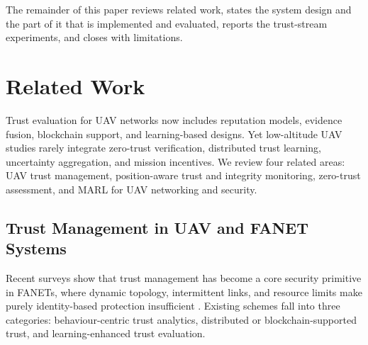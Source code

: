 \documentclass[notspecified,article,submit,moreauthors]{Definitions/mdpi}
\begin{document}
\begin{itemize}
\end{itemize}

The remainder of this paper reviews related work, states the system design and the part of it that is implemented and evaluated, reports the trust-stream experiments, and closes with limitations.

\section{Related Work}
Trust evaluation for UAV networks now includes reputation models, evidence fusion, blockchain support, and learning-based designs. Yet low-altitude UAV studies rarely integrate zero-trust verification, distributed trust learning, uncertainty aggregation, and mission incentives. We review four related areas: UAV trust management, position-aware trust and integrity monitoring, zero-trust assessment, and MARL for UAV networking and security.

\subsection{Trust Management in UAV and FANET Systems}
Recent surveys show that trust management has become a core security primitive in FANETs, where dynamic topology, intermittent links, and resource limits make purely identity-based protection insufficient \cite{kundu2024survey,noor2020fanet,brik2020fluav,nguyen2021fliotsurvey,qu2021dflun}. Existing schemes fall into three categories: behaviour-centric trust analytics, distributed or blockchain-supported trust, and learning-enhanced trust evaluation.
\end{document}
